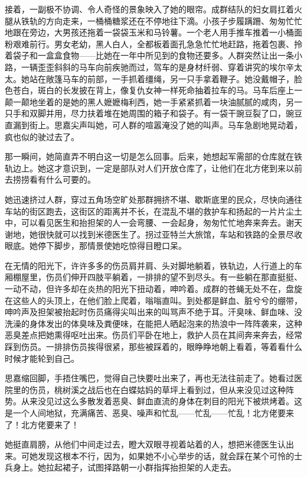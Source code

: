 \par 接着，一副极不协调、令人奇怪的景象映入了她的眼帘。成群结队的妇女肩扛着火腿从铁轨的方向走来，一桶桶糖浆还在不停地往下滴。小孩子步履蹒跚、匆匆忙忙地跟在旁边，大男孩还拖着一袋袋玉米和马铃薯。一个老人用手推车推着一小桶面粉艰难前行。男女老幼，黑人白人，全都板着面孔急急忙忙地赶路，拖着包裹、拎着袋子和一盒盒食物——比她在一年中所见到的食物还要多。人群突然让出一条小路，一辆歪歪斜斜的马车向前疾驰而过，驾车的是身材纤弱、穿着讲究的埃尔辛太太。她站在敞篷马车的前部，一手抓着缰绳，另一只手拿着鞭子。她没戴帽子，脸色苍白，斑白的长发披在背上，像复仇女神一样死命抽着拉车的马。马车后座上一颠一颠地坐着的是她的黑人嬷嬷梅利西，她一手紧紧抓着一块油腻腻的咸肉，另一只手和双脚并用，尽力扶着堆在她周围的箱子和袋子。有一袋干豌豆裂了口，豌豆直漏到街上。思嘉尖声叫她，可人群的喧嚣淹没了她的叫声。马车急剧地晃动着，疯也似的驶过去了。
\par 那一瞬间，她简直弄不明白这一切是怎么回事。后来，她想起军需部的仓库就在铁轨边上。她这才意识到，一定是部队对人们开放仓库了，让他们在北方佬到来以前去捞捞看有什么可要的。
\par 她迅速挤过人群，穿过五角场空旷处那群拥挤不堪、歇斯底里的民众，尽快向通往车站的街区跑去，这街区的距离并不长，在混乱不堪的救护车和扬起的一片片尘土中，可以看见医生和抬担架的人一会弯腰、一会起身，匆匆忙忙地奔来奔去。谢天谢地，她很快就可以找到米德医生了。拐过亚特兰大旅馆，车站和铁路的全景尽收眼底。她停下脚步，那情景使她吃惊得目瞪口呆。
\par 在无情的阳光下，许许多多的伤员肩并肩、头对脚地躺着，铁轨边，人行道上的车厢棚屋里，伤员们伸开四肢平躺着，一排排的望不到尽头。有一些躺在那直挺挺、一动不动，但许多却在炎热的阳光下扭动着，呻吟着。成群的苍蝇无处不在，盘旋在这些人的头顶上，在他们脸上爬着，嗡嗡直叫。到处都是鲜血、脏兮兮的绷带，呻吟声及担架被抬起时伤员痛得尖叫出来的叫骂声不绝于耳。汗臭味、鲜血味、没洗澡的身体发出的体臭味及粪便味，在能把人晒起泡来的热浪中一阵阵袭来，这种恶臭差点把她熏得呕吐出来。伤员们平卧在地上，救护人员在其间奔来奔去，经常踩到伤员。一排排伤员挨得很紧，那些被踩着的，眼睁睁地朝上看着，等着看什么时候才能轮到自己。
\par 思嘉缩回脚，手捂住嘴巴，觉得自己快要吐出来了，再也无法往前走了。她看过医院里的伤员，桃树溪之战后也在白蝶姑妈的草坪上看到过，但从来没见过这种阵势。从来没见过这么多散发着恶臭、鲜血直流的身体在刺目的阳光下被烘烤着。这是一个人间地狱，充满痛苦、恶臭、噪声和忙乱——忙乱——忙乱！北方佬要来了！北方佬要来了！
\par 她挺直肩膀，从他们中间走过去，瞪大双眼寻视着站着的人，想把米德医生认出来。可她发现这根本不行，因为，如果她不小心举步的话，就会踩在某个可怜的士兵身上。她拉起裙子，试图择路朝一小群指挥抬担架的人走去。
